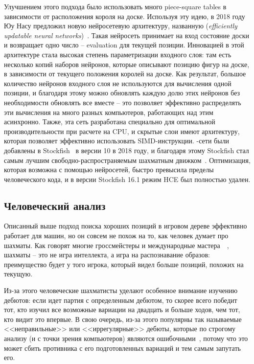 \documentclass{article}
\begin{document}
Улучшением этого подхода было использовать много piece-square tables
в зависимости от расположения короля на доске. 
Используя эту идею, в 2018 году Юу Насу предложил новую нейросетевую архитектуру,
названную  (\emph{efficiently updatable neural networks})~\cite{nnue-paper}.
Такая нейросеть принимает на вход состояние доски и возвращает одно число -- evaluation
для текущей позиции.
Инновацией в этой архитектуре стала высокая степень параметризации входного слоя:
там есть несколько копий наборов нейронов, которые описывают позицию фигур на доске,
в зависимости от текущего положения королей на доске.
Как результат, большое количество нейронов входного слоя 
не используются для вычисления одной позиции,
и благодаря этому можно обновлять каждую долю этих нейронов без необходимости
обновлять все вместе --
это позволяет эффективно распределять эти вычисления на много разных компьютеров,
работающих над этим асинхронно.
Также, эта сеть разработана специально для оптимальной производительности
при расчете на CPU,
и скрытые слои имеют архитектуру, которая позволяет эффективно использовать SIMD-инструкции.
-сети были добавлены в Stockfish~\cite{stockfish} в версии 10 в 2018 году,
и благодаря этому Stockfish стал самым лучшим свободно-распространяемым шахматным движком~\cite{tcec-superfinal}.
Оптимизация, которая возможна с помощью нейросетей, быстро превысила пределы человеческого кода,
и в версии Stockfish 16.1 режим HCE был полностью удален.

\subsection{Человеческий анализ}

Описанный выше подход поиска хороших позиций в игровом дереве
эффективно работает для машин,
но он совсем не похож на то, как человек думает про шахматы.
Как говорят многие гроссмейстеры и международные мастера~\cite{benfinegold-blundering-short}~\cite{gothamchess-patterns},
шахматы -- это не игра интеллекта, а игра на распознавание образов:
преимущество будет у того игрока, который видел больше позиций, похожих на текущую. 

Из-за этого человеческие шахматисты уделают особенное внимание
изучению дебютов: если идет партия с определенным дебютом,
то скорее всего победит тот, кто изучил все возможные вариации на двадцать и больше ходов,
чем тот, кто видит это впервые.
В свою очередь, из-за этого популярны так называемые <<неправильные>> или <<иррегулярные>> дебюты,
которые по строгому анализу (и с точки зрения компьютеров) являются ошибочными~\cite{chessbase-chess-openings},
потому что это может сбить противника с его подготовленных вариаций и тем самым запутать его.
\end{document}
